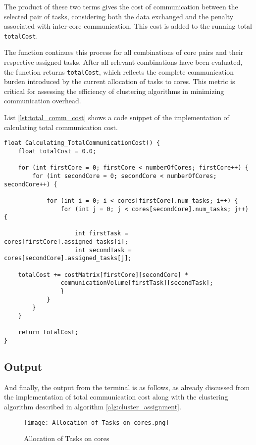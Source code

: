 \documentclass[conference]{IEEEtran}
\begin{document}
The product of these two terms gives the cost of communication between the selected pair of tasks, considering both the data exchanged and the penalty associated with inter-core communication. This cost is added to the running total \texttt{totalCost}.

The function continues this process for all combinations of core pairs and their respective assigned tasks. After all relevant combinations have been evaluated, the function returns \texttt{totalCost}, which reflects the complete communication burden introduced by the current allocation of tasks to cores. This metric is critical for assessing the efficiency of clustering algorithms in minimizing communication overhead.

List \ref{lst:total_comm_cost} shows a code snippet of the implementation of calculating total communication cost. 

\begin{lstlisting}[caption={Function to calculate total communication cost}, label={lst:total_comm_cost}]
float Calculating_TotalCommunicationCost() {
    float totalCost = 0.0;

    for (int firstCore = 0; firstCore < numberOfCores; firstCore++) {
        for (int secondCore = 0; secondCore < numberOfCores; secondCore++) {

            for (int i = 0; i < cores[firstCore].num_tasks; i++) {
                for (int j = 0; j < cores[secondCore].num_tasks; j++) {

                    int firstTask = cores[firstCore].assigned_tasks[i];
                    int secondTask = cores[secondCore].assigned_tasks[j];

    totalCost += costMatrix[firstCore][secondCore] * 
                communicationVolume[firstTask][secondTask];
                }
            }
        }
    }

    return totalCost;
}
\end{lstlisting}
\subsection{Output}
\label{subsec: Output}
And finally, the output from the terminal is as follows, as already discussed from the implementation of total communication cost along with the clustering algorithm described in algorithm \ref{alg:cluster_assignment}. 

\begin{figure}[h!]
    \centering
    \texttt{[image: Allocation of Tasks on cores.png]}
    \caption{Allocation of Tasks on cores}
    \label{fig:enter-label}
\end{figure}
\end{document}
